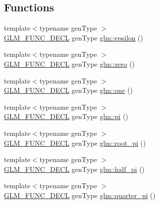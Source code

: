 \subsection*{Functions}
\begin{DoxyCompactItemize}
\item 
{\footnotesize template$<$typename gen\+Type $>$ }\\\hyperlink{setup_8hpp_ab2d052de21a70539923e9bcbf6e83a51}{G\+L\+M\+\_\+\+F\+U\+N\+C\+\_\+\+D\+E\+CL} gen\+Type \hyperlink{group__gtc__constants_gacb41049b8d22c8aa90e362b96c524feb}{glm\+::epsilon} ()
\item 
{\footnotesize template$<$typename gen\+Type $>$ }\\\hyperlink{setup_8hpp_ab2d052de21a70539923e9bcbf6e83a51}{G\+L\+M\+\_\+\+F\+U\+N\+C\+\_\+\+D\+E\+CL} gen\+Type \hyperlink{group__gtc__constants_ga5cc97dd01d37fc199264ff6030578435}{glm\+::zero} ()
\item 
{\footnotesize template$<$typename gen\+Type $>$ }\\\hyperlink{setup_8hpp_ab2d052de21a70539923e9bcbf6e83a51}{G\+L\+M\+\_\+\+F\+U\+N\+C\+\_\+\+D\+E\+CL} gen\+Type \hyperlink{group__gtc__constants_ga8186ec2c330457d41d9686c47cd3b2d1}{glm\+::one} ()
\item 
{\footnotesize template$<$typename gen\+Type $>$ }\\\hyperlink{setup_8hpp_ab2d052de21a70539923e9bcbf6e83a51}{G\+L\+M\+\_\+\+F\+U\+N\+C\+\_\+\+D\+E\+CL} gen\+Type \hyperlink{group__gtc__constants_gae671930537266a9a650ccb4b88757692}{glm\+::pi} ()
\item 
{\footnotesize template$<$typename gen\+Type $>$ }\\\hyperlink{setup_8hpp_ab2d052de21a70539923e9bcbf6e83a51}{G\+L\+M\+\_\+\+F\+U\+N\+C\+\_\+\+D\+E\+CL} gen\+Type \hyperlink{group__gtc__constants_ga1cfeb345f34f72697d14f4db8d5d4c6c}{glm\+::root\+\_\+pi} ()
\item 
{\footnotesize template$<$typename gen\+Type $>$ }\\\hyperlink{setup_8hpp_ab2d052de21a70539923e9bcbf6e83a51}{G\+L\+M\+\_\+\+F\+U\+N\+C\+\_\+\+D\+E\+CL} gen\+Type \hyperlink{group__gtc__constants_ga7f7a1050729f3b03b1873a06ba4a472f}{glm\+::half\+\_\+pi} ()
\item 
{\footnotesize template$<$typename gen\+Type $>$ }\\\hyperlink{setup_8hpp_ab2d052de21a70539923e9bcbf6e83a51}{G\+L\+M\+\_\+\+F\+U\+N\+C\+\_\+\+D\+E\+CL} gen\+Type \hyperlink{group__gtc__constants_ga0148d757b4bfda4d86251b8d1ea1dad3}{glm\+::quarter\+\_\+pi} ()

\end{DoxyCompactItemize}
